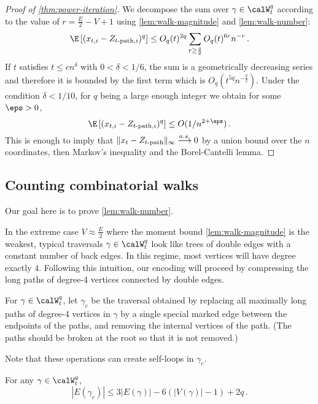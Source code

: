 \documentclass[12pt]{article}
\begin{document}
\begin{proof}[Proof of \cref{thm:power-iteration}]
    We decompose the sum over $\gamma\in\calW_t^q$ according to the value of $r=\frac E 2 - V + 1$ using \cref{lem:walk-magnitude} and \cref{lem:walk-number}:
    \[
        \E \left[(x_{t,i}-Z_{t\textnormal{-path},i})^q\right] \le O_q(t)^{2q} \sum_{r\ge \frac q 2}         O_q(t)^{6r} n^{-r}\,.
    \]
    If $t$ satisfies $t\le cn^{\delta}$ with $0<\delta<1/6$, the sum is a geometrically decreasing series and therefore it is bounded by the first term which is $O_q(t^{5q}n^{-\frac q 2})$. Under the condition $\delta<1/10$, for $q$ being a large enough integer we obtain for some $\eps > 0$,
    \[
        \E \left[(x_{t,i}-Z_{t\textnormal{-path},i})^q\right]\le O(1/n^{2+\eps})\,.
    \]
    This is enough to imply that $\|x_{t}-Z_{t\textnormal{-path}}\|_\infty
    \overset{a.s.}{\longrightarrow} 0$ by a union bound over the $n$ coordinates, then Markov's inequality and the Borel-Cantelli lemma.
\end{proof}

\subsection{Counting combinatorial walks}

Our goal here is to prove \cref{lem:walk-number}. 

In the extreme case $V\approx \frac {E} 2$ where the moment bound \cref{lem:walk-magnitude} is the weakest, typical traversals $\gamma\in\calW^q_t$ look like trees of double edges with a constant number of back edges. In this regime, most vertices will have degree exactly $4$. Following this intuition, our encoding will proceed by compressing the long paths of degree-4 vertices connected by double edges.

\begin{definition}\label{def:contracted-walk}
    For $\gamma\in \calW_t^q$, let $\gamma_c$ be the traversal obtained by replacing all maximally long paths of degree-4 vertices in $\gamma$ by a single special marked edge between the endpoints of the paths, and removing the internal vertices of the path.
    (The paths should be broken at the root so that it is not removed.)
\end{definition}

Note that these operations can create self-loops in $\gamma_c$.


\begin{lemma}\label{lem:size-contracted}
    For any $\gamma\in\calW_t^q$,
    \[
        |E(\gamma_c)|\le 3|E(\gamma)|-6(|V(\gamma)|-1)+2q\,.
    \]
\end{lemma}
\end{document}
